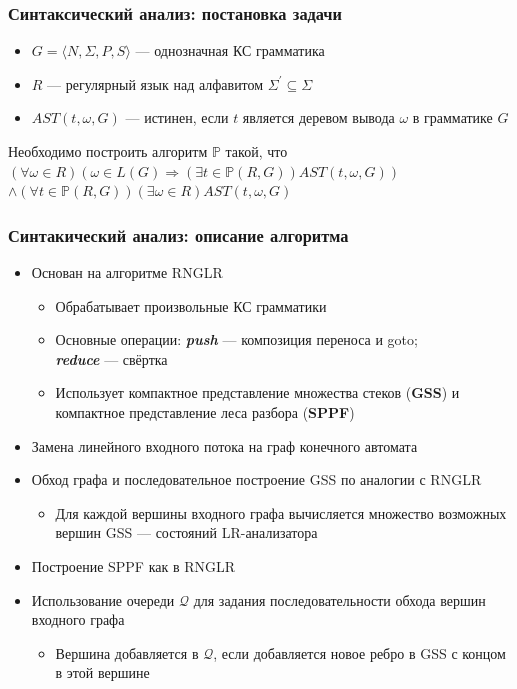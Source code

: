 \documentclass{beamer}
\begin{document}
\begin{frame}
    \transwipe[direction=90]
    \frametitle{Синтаксический анализ: постановка задачи}
    \begin{itemize}    
        \item $G=\langle N,\Sigma, P,S\rangle$ --- однозначная КС грамматика
        \item $R$ --- регулярный язык над алфавитом ${\Sigma}^{'} \subseteq \Sigma $
        \item $AST(t,\omega,G)$ --- истинен, если $t$ является деревом вывода $\omega$ в грамматике $G$
    \end{itemize}
    \begin{block}{}
    Необходимо построить алгоритм $\mathbb{P}$ такой, что
    $(\forall \omega \in R) (\omega \in L(G) \Rightarrow (\exists t \in \mathbb{P}(R,G))AST(t, \omega, G))$
    $\land (\forall t \in \mathbb{P}(R,G))(\exists \omega \in R)AST(t,\omega,G)$
    \end{block}
\end{frame}

\begin{frame}
    \transwipe[direction=90]
    \frametitle{Синтакический анализ: описание алгоритма}
    \begin{itemize}         
        \item Основан на алгоритме RNGLR
        \begin{itemize}         
           \item Обрабатывает произвольные КС грамматики
           \item Основные операции: {\bfseries{\textit{push}}} --- композиция переноса и goto; \\ 
           {\color{white}{Основные операции:}}                          
           {\bfseries{\textit{reduce}}} --- свёртка
           \item Использует компактное представление множества стеков ({\bfseries GSS}) и компактное представление леса разбора ({\bfseries SPPF})
        \end{itemize}
        \item Замена линейного входного потока на граф конечного автомата
        \item Обход графа и последовательное построение GSS по аналогии с RNGLR
            \begin{itemize}         
                \item Для каждой вершины входного графа вычисляется множество возможных вершин GSS --- состояний LR-анализатора
            \end{itemize}
        \item Построение SPPF как в RNGLR
        \item Использование очереди $\mathcal Q$ для задания последовательности обхода вершин 
        входного графа
            \begin{itemize}         
                \item Вершина добавляется в $\mathcal Q$, если добавляется новое ребро в GSS с концом в этой вершине
            \end{itemize}
    \end{itemize}
\end{frame}
\end{document}
